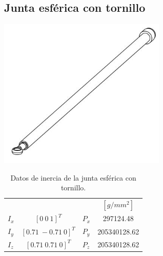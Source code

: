 \subsection{Junta esférica con tornillo}
\includegraphics[width=8cm]{03_Reporte/img/vastago_D.JPG}
\begin{table}[hb!]
 \begin{center}
\begin{tabular}{lclc}


% 

 & & & $[g/mm^2]$\\
 $ I_x $ & $ [0 \ 0 \ 1]^T $ & $ P_x $ & 297124.48\\
 $ I_y $ & $ [0.71 \ -0.71 \ 0]^T $ & $ P_y $ & 205340128.62\\
 $ I_z $ & $ [0.71 \ 0.71 \ 0]^T $ & $ P_z $ & 205340128.62
\end{tabular}
\end{center}
\caption{Datos de inercia de la junta esférica con tornillo.}
\label{tab: inertia table joint}
\end{table}
